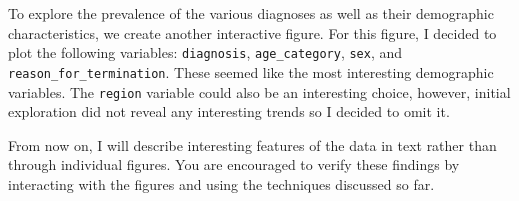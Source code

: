 \documentclass[
  openany]{book}
\newenvironment{Shaded}{\begin{snugshade}}{\end{snugshade}}
\newcommand{\AttributeTok}[1]{\textcolor[rgb]{0.13,0.29,0.53}{#1}}
\newcommand{\CommentTok}[1]{\textcolor[rgb]{0.56,0.35,0.01}{\textit{#1}}}
\newcommand{\FunctionTok}[1]{\textcolor[rgb]{0.13,0.29,0.53}{\textbf{#1}}}
\newcommand{\NormalTok}[1]{#1}
\newcommand{\OtherTok}[1]{\textcolor[rgb]{0.56,0.35,0.01}{#1}}
\newcommand{\SpecialCharTok}[1]{\textcolor[rgb]{0.81,0.36,0.00}{\textbf{#1}}}
\theoremstyle{definition}
\theoremstyle{definition}
\theoremstyle{definition}
\theoremstyle{definition}
\theoremstyle{remark}
\begin{document}
To explore the prevalence of the various diagnoses as well as their demographic characteristics, we create another interactive figure. For this figure, I decided to plot the following variables: \texttt{diagnosis}, \texttt{age\_category}, \texttt{sex}, and \texttt{reason\_for\_termination}. These seemed like the most interesting demographic variables. The \texttt{region} variable could also be an interesting choice, however, initial exploration did not reveal any interesting trends so I decided to omit it.

From now on, I will describe interesting features of the data in text rather than through individual figures. You are encouraged to verify these findings by interacting with the figures and using the techniques discussed so far.

\begin{Shaded}
\end{Shaded}
\end{document}
